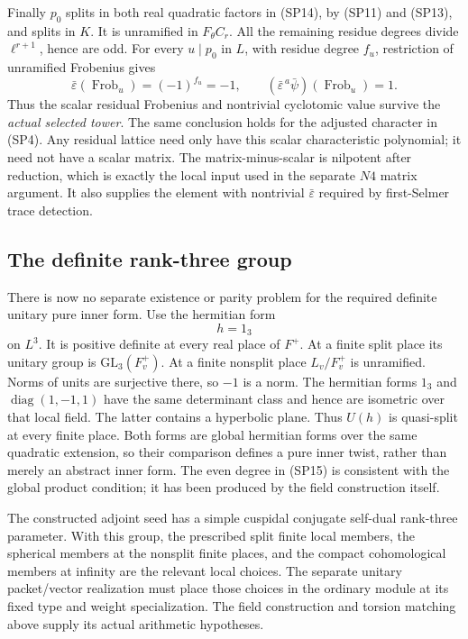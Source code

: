 Finally \(p_0\) splits in both real quadratic factors in
(SP14), by (SP11) and (SP13), and splits in \(K\).
It is unramified in \(F_\theta C_r\).
All the remaining residue degrees divide
\(\ell^{r+1}\), hence are odd.
For every \(u\mid p_0\) in \(L\), with residue degree \(f_u\),
restriction of unramified Frobenius gives
\[
 \bar\varepsilon(\operatorname{Frob}_u)
                       =(-1)^{f_u}=-1,\qquad
 (\bar\varepsilon^{\,a}\bar\psi)(\operatorname{Frob}_u)=1.
 \tag{SP17}
\]
Thus the scalar residual Frobenius and nontrivial
cyclotomic value survive the \emph{actual selected tower}.
The same conclusion holds for the adjusted character in
(SP4).
Any residual lattice need only have this scalar
characteristic polynomial; it need not have a scalar
matrix.  The matrix-minus-scalar is nilpotent after
reduction, which is exactly the local input used in the
separate \(N4\) matrix argument.
It also supplies the element with nontrivial
\(\bar\varepsilon\) required by first-Selmer trace detection.

\subsection{The definite rank-three group}
There is now no separate existence or parity problem for
the required definite unitary pure inner form.
Use the hermitian form
\[
                             h=1_3
\]
on \(L^3\).
It is positive definite at every real place of \(F^+\).
At a finite split place its unitary group is
\(\mathrm{GL}_3(F_v^+)\).
At a finite nonsplit place \(L_v/F_v^+\) is unramified.
Norms of units are surjective there, so \(-1\) is a norm.
The hermitian forms \(1_3\) and
\(\operatorname{diag}(1,-1,1)\) have the same determinant
class and hence are isometric over that local field.
The latter contains a hyperbolic plane.
Thus \(U(h)\) is quasi-split at every finite place.
Both forms are global hermitian forms over the same
quadratic extension, so their comparison defines a
pure inner twist, rather than merely an abstract inner
form.
The even degree in (SP15) is consistent with the global
product condition; it has been produced by the field
construction itself.

The constructed adjoint seed has a simple cuspidal
conjugate self-dual rank-three parameter.
With this group, the prescribed split finite local
members, the spherical members at the nonsplit finite
places, and the compact cohomological members at infinity
are the relevant local choices.
The separate unitary packet/vector realization must place
those choices in the ordinary module at its fixed type
and weight specialization.
The field construction and torsion matching above supply
its actual arithmetic hypotheses.


